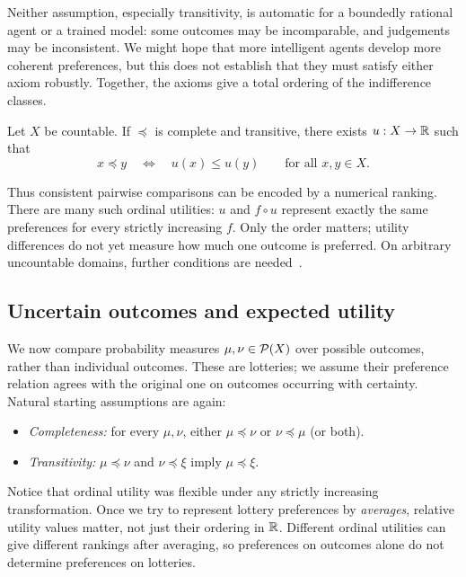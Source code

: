 Neither assumption, especially transitivity, is automatic for a boundedly rational agent or a trained model: some outcomes may be incomparable, and judgements may be inconsistent. We might hope that more intelligent agents develop more coherent preferences, but this does not establish that they must satisfy either axiom robustly. Together, the axioms give a total ordering of the indifference classes.

\begin{theorem}
Let $X$ be countable. If $\preceq$ is complete and transitive, there exists $u:X\to\mathbb{R}$ such that
\[
  x\preceq y \quad\Longleftrightarrow\quad u(x)\leq u(y)
  \qquad\text{for all }x,y\in X.
\]
\end{theorem}
Thus consistent pairwise comparisons can be encoded by a numerical ranking. There are many such ordinal utilities: $u$ and $f\circ u$ represent exactly the same preferences for every strictly increasing $f$. Only the order matters; utility differences do not yet measure how much one outcome is preferred. On arbitrary uncountable domains, further conditions are needed~\cite[Section~4]{rosas2026preferences}.

\subsection{Uncertain outcomes and expected utility}

We now compare probability measures $\mu,\nu\in\mathcal{P}(X)$ over possible outcomes, rather than individual outcomes. These are lotteries; we assume their preference relation agrees with the original one on outcomes occurring with certainty. Natural starting assumptions are again:
\begin{itemize}
  \item \emph{Completeness:} for every $\mu,\nu$, either $\mu\preceq\nu$ or $\nu\preceq\mu$ (or both).
  \item \emph{Transitivity:} $\mu\preceq\nu$ and $\nu\preceq\xi$ imply $\mu\preceq\xi$.
\end{itemize}
Notice that ordinal utility was flexible under any strictly increasing transformation. Once we try to represent lottery preferences by \emph{averages}, relative utility values matter, not just their ordering in $\mathbb{R}$. Different ordinal utilities can give different rankings after averaging, so preferences on outcomes alone do not determine preferences on lotteries.

